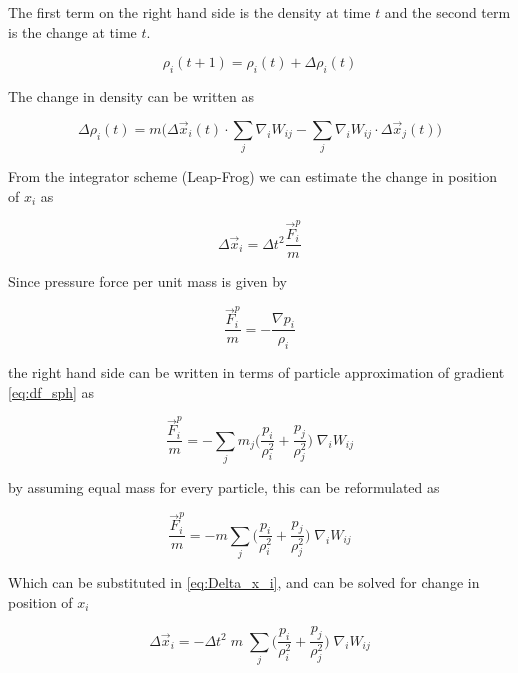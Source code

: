 The first term on the right hand side is the density at time $t$ and the
second term is the change at time $t$.

\begin{equation*}
  \rho_i(t+1) = \rho_i(t) + \Delta \rho_i(t)
\end{equation*}

The change in density can be written as

\begin{equation}
  \label{eq:density_difference}
  \Delta \rho_i(t) = m \big(\Delta\vec{x}_i(t) \cdot \sum_j \nabla_i W_{ij} - \sum_j \nabla_i W_{ij} \cdot \Delta\vec{x}_j(t) \big)
\end{equation}

From the integrator scheme (Leap-Frog) we can estimate the change in position
of $x_i$ as


\begin{equation*}
  \label{eq:Delta_x_i}
  \Delta \vec{x}_i = \Delta t^2
  \frac{\vec{F}_i^p}{m}
\end{equation*}

Since pressure force per unit mass is given by


\begin{equation*} \frac{\vec{F}_i^p}{m} = - \frac{\nabla p_i}{\rho_i}
\end{equation*}

the right hand side can be written in terms of particle approximation of
gradient \ref{eq:df_sph} as

\begin{equation*}
  \frac{\vec{F}_i^p}{m} = - \sum_j m_j \bigg(
  \frac{p_i}{\rho_i^2} + \frac{p_j}{\rho_j^2} \bigg)\;\nabla_i W_{ij}
\end{equation*}

by assuming equal mass for every particle, this can be reformulated as

\begin{equation*}
  \frac{\vec{F}_i^p}{m} = - m \sum_j \bigg(
  \frac{p_i}{\rho_i^2} + \frac{p_j}{\rho_j^2} \bigg)\;\nabla_i W_{ij}
\end{equation*}

Which can be substituted in \ref{eq:Delta_x_i}, and can be solved for change in
position of $x_i$

\begin{equation*}
  \Delta \vec{x}_i = - \Delta t^2 \; m \; \sum_j \bigg(
  \frac{p_i}{\rho_i^2} + \frac{p_j}{\rho_j^2} \bigg)\;\nabla_i W_{ij}
\end{equation*}

